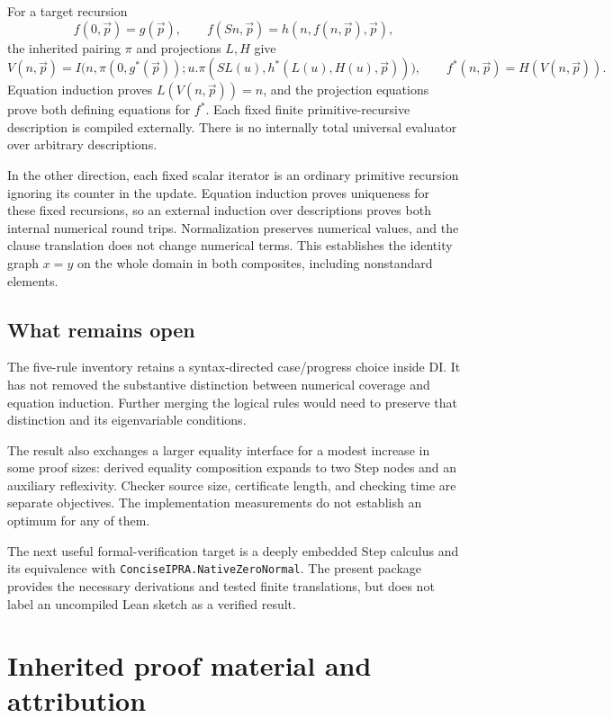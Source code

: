 For a target recursion
\[
 f(0,\vec p)=g(\vec p),\qquad
 f(Sn,\vec p)=h(n,f(n,\vec p),\vec p),
\]
the inherited pairing \(\pi\) and projections \(L,H\) give
\[
 V(n,\vec p)=I\bigl(n,\pi(0,g^*(\vec p));
     u.\pi(SL(u),h^*(L(u),H(u),\vec p))\bigr),
 \qquad f^*(n,\vec p)=H(V(n,\vec p)).
\]
Equation induction proves \(L(V(n,\vec p))=n\), and the projection
equations prove both defining equations for \(f^*\).
Each fixed finite primitive-recursive description is compiled
externally. There is no internally total universal evaluator over
arbitrary descriptions.

In the other direction, each fixed scalar iterator is an ordinary
primitive recursion ignoring its counter in the update.
Equation induction proves uniqueness for these fixed recursions,
so an external induction over descriptions proves both internal
numerical round trips. Normalization preserves numerical values,
and the clause translation does not change numerical terms.
This establishes the identity graph \(x=y\) on the whole domain
in both composites, including nonstandard elements.

\subsection{What remains open}

The five-rule inventory retains a syntax-directed case/progress
choice inside DI. It has not removed the substantive distinction
between numerical coverage and equation induction. Further merging
the logical rules would need to preserve that distinction and its
eigenvariable conditions.

The result also exchanges a larger equality interface for a modest
increase in some proof sizes: derived equality composition expands
to two Step nodes and an auxiliary reflexivity. Checker source
size, certificate length, and checking time are separate objectives.
The implementation measurements do not establish an optimum for
any of them.

The next useful formal-verification target is a deeply embedded
Step calculus and its equivalence with
\texttt{ConciseIPRA.NativeZeroNormal}. The present package provides
the necessary derivations and tested finite translations, but
does not label an uncompiled Lean sketch as a verified result.

\clearpage
\appendix
\section{Inherited proof material and attribution}

